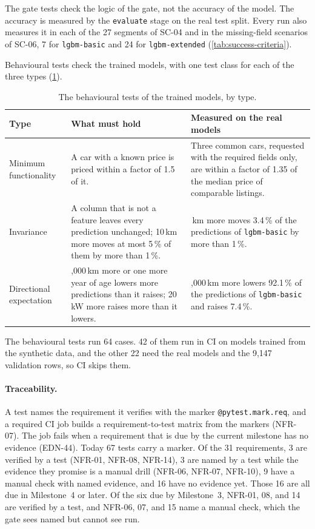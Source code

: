 The gate tests check the logic of the gate, not the accuracy of the model.
The accuracy is measured by the \texttt{evaluate} stage on the real test split.
Every run also measures it in each of the 27 segments of SC-04 and in the missing-field scenarios of SC-06, 7 for \texttt{lgbm-basic} and 24 for \texttt{lgbm-extended} (\cref{tab:success-criteria}).

Behavioural tests check the trained models, with one test class for each of the three types (\cref{tab:behavioural-tests}).

\begin{table}[ht]
  \centering\small
  \begin{tabularx}{\textwidth}{@{}>{\raggedright\arraybackslash}p{}>{\raggedright\arraybackslash}X>{\raggedright\arraybackslash}X@{}}
    \toprule
    Type & What must hold & Measured on the real models \\
    \midrule
    Minimum functionality & A car with a known price is priced within a factor of 1.5 of it. & Three common cars, requested with the required fields only, are within a factor of 1.35 of the median price of comparable listings. \\
    \addlinespace[2pt]
    Invariance & A column that is not a feature leaves every prediction unchanged; 10\,km more moves at most 5\,\% of them by more than 1\,\%. & 10\,km more moves 3.4\,\% of the predictions of \texttt{lgbm-basic} by more than 1\,\%. \\
    \addlinespace[2pt]
    Directional expectation & 20,000\,km more or one more year of age lowers more predictions than it raises; 20\,kW more raises more than it lowers. & 20,000\,km more lowers 92.1\,\% of the predictions of \texttt{lgbm-basic} and raises 7.4\,\%. \\
    \bottomrule
  \end{tabularx}
  \caption{The behavioural tests of the trained models, by type.}
  \label{tab:behavioural-tests}
\end{table}

The behavioural tests run 64 cases.
42 of them run in CI on models trained from the synthetic data, and the other 22 need the real models and the 9,147 validation rows, so CI skips them.

\paragraph{Traceability.}
A test names the requirement it verifies with the marker \texttt{@pytest.\allowbreak mark.\allowbreak req}, and a required CI job builds a requirement-to-test matrix from the markers (NFR-07).
The job fails when a requirement that is due by the current milestone has no evidence (EDN-44).
Today 67 tests carry a marker.
Of the 31 requirements, 3 are verified by a test (NFR-01, NFR-08, NFR-14), 3 are named by a test while the evidence they promise is a manual drill (NFR-06, NFR-07, NFR-10), 9 have a manual check with named evidence, and 16 have no evidence yet.
Those 16 are all due in Milestone~4 or later.
Of the six due by Milestone~3, NFR-01, 08, and 14 are verified by a test, and NFR-06, 07, and 15 name a manual check, which the gate sees named but cannot see run.

